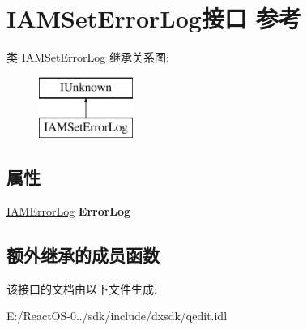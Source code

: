 \hypertarget{interface_i_a_m_set_error_log}{}\section{I\+A\+M\+Set\+Error\+Log接口 参考}
\label{interface_i_a_m_set_error_log}
类 I\+A\+M\+Set\+Error\+Log 继承关系图\+:\begin{figure}[H]
\begin{center}
\leavevmode
\includegraphics[height=2.000000cm]{interface_i_a_m_set_error_log}
\end{center}
\end{figure}
\subsection*{属性}
\begin{DoxyCompactItemize}
\item 
\mbox{\label{interface_i_a_m_set_error_log_a9ce1d4458f57f9438ca585d7f7813c1e}} 
\hyperlink{interface_i_a_m_error_log}{I\+A\+M\+Error\+Log} {\bfseries Error\+Log}
\end{DoxyCompactItemize}
\subsection*{额外继承的成员函数}


该接口的文档由以下文件生成\+:\begin{DoxyCompactItemize}
\item 
E\+:/\+React\+O\+S-\/0../sdk/include/dxsdk/qedit.\+idl\end{DoxyCompactItemize}
